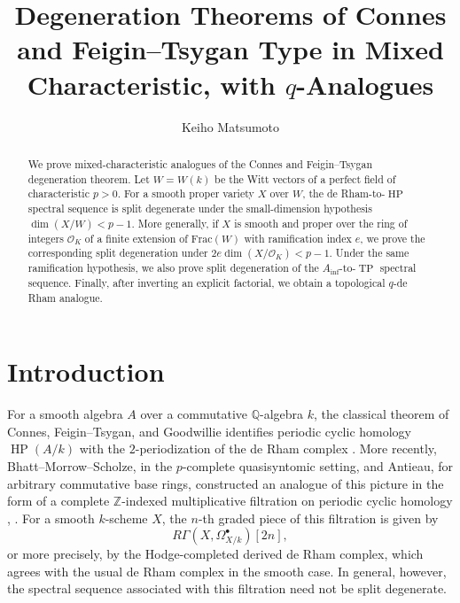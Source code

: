 \documentclass[11pt]{amsart}
\numberwithin{equation}{section}
\newcommand{\Q}{\mathbb{Q}}
\newcommand{\Z}{\mathbb{Z}}
\newcommand{\sO}{\mathcal{O}}
\numberwithin{equation}{section}
\newcommand{\Ainf}{A_{\operatorname{inf}}}
\newcommand{\TP}{\operatorname{TP}}
\newcommand{\HP}{\operatorname{HP}}
\begin{document}
\title[Degeneration Theorems in Mixed Characteristic]{Degeneration Theorems of Connes and Feigin--Tsygan Type in Mixed Characteristic, with \texorpdfstring{$q$}{q}-Analogues}

\author{Keiho Matsumoto}
\address{Graduate School of Science, Osaka University, Toyonaka, Osaka 560-0043, Japan}

\begin{abstract}
We prove mixed-characteristic analogues of the Connes and Feigin--Tsygan degeneration theorem. Let $W=W(k)$ be the Witt vectors of a perfect field of characteristic $p>0$. For a smooth proper variety $X$ over $W$, the de Rham-to-$\HP$ spectral sequence is split degenerate under the small-dimension hypothesis $\dim(X/W)<p-1$. More generally, if $X$ is smooth and proper over the ring of integers $\sO_K$ of a finite extension of $\mathrm{Frac}(W)$ with ramification index $e$, we prove the corresponding split degeneration under $2e\dim(X/\sO_K)<p-1$. Under the same ramification hypothesis, we also prove split degeneration of the $\Ainf$-to-$\TP$ spectral sequence. Finally, after inverting an explicit factorial, we obtain a topological $q$-de Rham analogue.
\end{abstract}

\maketitle

\tableofcontents

\section{Introduction}

For a smooth algebra $A$ over a commutative $\Q$-algebra $k$, the classical theorem of Connes, Feigin--Tsygan, and Goodwillie identifies periodic cyclic homology $\HP(A/k)$ with the $2$-periodization of the de Rham complex \cite{C83,FT83,G85}. More recently, Bhatt--Morrow--Scholze, in the $p$-complete quasisyntomic setting, and Antieau, for arbitrary commutative base rings, constructed an analogue of this picture in the form of a complete $\Z$-indexed multiplicative filtration on periodic cyclic homology \cite[Theorem~1.17]{BMS19}, \cite[Theorem~1.1]{A19}. For a smooth $k$-scheme $X$, the $n$-th graded piece of this filtration is given by
\[
R\Gamma(X,\Omega^\bullet_{X/k})[2n],
\]
or more precisely, by the Hodge-completed derived de Rham complex, which agrees with the usual de Rham complex in the smooth case. In general, however, the spectral sequence associated with this filtration need not be split degenerate.
\end{document}
